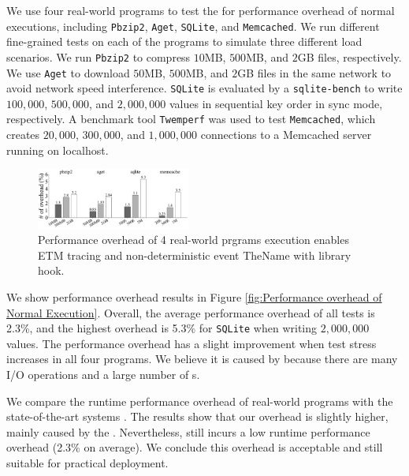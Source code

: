 We use four real-world programs to test the \TheName for performance overhead of
normal executions, including \texttt{Pbzip2}, \texttt{Aget}, \texttt{SQLite},
and \texttt{Memcached}. We run different fine-grained tests on each of the
programs to simulate three different load scenarios. We run \texttt{Pbzip2} to
compress $10$MB, $500$MB, and $2$GB files, respectively. We use \texttt{Aget} to
download $50$MB, $500$MB, and $2$GB files in the same network to
avoid network speed interference. \texttt{SQLite} is evaluated by a
\texttt{sqlite-bench} \cite{sqlitebench} to write $100,000$, $500,000$, and
$2,000,000$ values in sequential key order in sync mode, respectively. A
benchmark tool \texttt{Twemperf} \cite{twemperf} was used to test
\texttt{Memcached}, which creates $20,000$, $300,000$, and $1,000,000$
connections to a Memcached server running on localhost.

\begin{figure}
    \centering
    \includegraphics[width=0.45\textwidth]{figures/normaloverheadbar.pdf}
    \caption{Performance overhead of 4 real-world prgrams execution enables ETM tracing and non-deterministic event TheName with library hook.}
    \label{fig:Performance overhead of Normal Execution}
\end{figure}


We show performance overhead results in Figure \ref{fig:Performance overhead of
    Normal Execution}.
Overall, the average performance overhead of all tests is 2.3\%, and the highest
overhead is 5.3\% for \texttt{SQLite} when writing $2,000,000$ values. The
performance overhead has a slight improvement when test stress increases in all
four programs. We believe it is caused by \TheName because there are many I/O
operations and a large number of \syscall{}s.

We compare the runtime performance overhead of real-world programs with the
state-of-the-art systems \cite{cui2018rept, kasikci_lazy_2017}. The results show
that our overhead is slightly higher, mainly caused by the
\TheName. Nevertheless, \TheName still incurs a low runtime performance overhead
(2.3\% on average). We conclude this overhead is acceptable and still suitable for
practical deployment.

